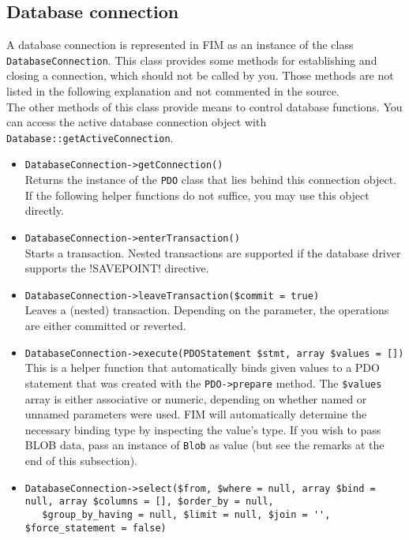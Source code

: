 \documentclass{scrartcl}
\begin{document}
   \subsection{Database connection}
      A database connection is represented in FIM as an instance of the class \lstinline!DatabaseConnection!. This class provides some methods for establishing and closing a connection, which should not be called by you. Those methods are not listed in the following explanation and not commented in the source. \\
      The other methods of this class provide means to control database functions. You can access the active database connection object with \lstinline!Database::getActiveConnection!.
      \begin{itemize}
         \item \lstinline!DatabaseConnection->getConnection()! \\
            Returns the instance of the \lstinline!PDO! class that lies behind this connection object. If the following helper functions do not suffice, you may use this object directly.
         \item \lstinline!DatabaseConnection->enterTransaction()! \\
            Starts a transaction. Nested transactions are supported if the database driver supports the \mysql!SAVEPOINT! directive.
         \item \lstinline!DatabaseConnection->leaveTransaction($commit = true)! \\
            Leaves a (nested) transaction. Depending on the parameter, the operations are either committed or reverted.
         \item \lstinline!DatabaseConnection->execute(PDOStatement $stmt, array $values = [])! \\
            This is a helper function that automatically binds given values to a PDO statement that was created with the \lstinline!PDO->prepare! method. The \lstinline!$values! array is either associative or numeric, depending on whether named or unnamed parameters were used. FIM will automatically determine the necessary binding type by inspecting the value's type. If you wish to pass BLOB data, pass an instance of \lstinline!Blob! as value (but see the remarks at the end of this subsection).
         \item \lstinline!DatabaseConnection->select($from, $where = null, array $bind = null, array $columns = [], $order_by = null,! \\ \lstinline!   $group_by_having = null, $limit = null, $join = '', $force_statement = false)! \\

\end{itemize}
\end{document}
